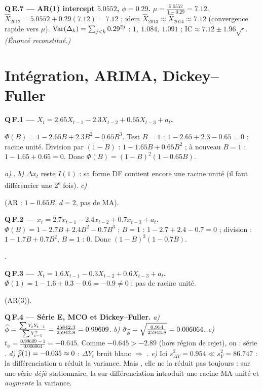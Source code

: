 \documentclass[11pt]{article}
\begin{document}
\textbf{Q\,E.7 --- AR(1) intercept $5.0552$, $\phi=0.29$.}
$\mu=\frac{5.0552}{1-0.29}=7.12$. $\widehat X_{2012}=5.0552+0.29(7.12)=7.12$ ; idem
$\widehat X_{2013}\approx\widehat X_{2014}\approx7.12$ (convergence rapide vers $\mu$).
$\operatorname{Var}(\Delta_k)=\sum_{j<k}0.29^{2j}$ : $1,\ 1.084,\ 1.091$ ; IC$\approx7.12\pm1.96\sqrt{\cdot}$.
\emph{(Énoncé reconstitué.)}

\section{Intégration, ARIMA, Dickey--Fuller}

\textbf{Q\,F.1 --- $X_t=2.65X_{t-1}-2.3X_{t-2}+0.65X_{t-3}+a_t$.}
\begin{etapes}
$\Phi(B)=1-2.65B+2.3B^2-0.65B^3$. Test $B=1$ : $1-2.65+2.3-0.65=0$ : racine unité.
Division par $(1-B)$ : $1-1.65B+0.65B^2$ ; à nouveau $B=1$ : $1-1.65+0.65=0$. Donc
$\Phi(B)=(1-B)^2(1-0.65B)$.
\end{etapes}
\emph{a)} . \emph{b)} $\Delta x_t$ reste $I(1)$ : sa forme DF
contient encore une racine unité (il faut différencier une 2\textsuperscript{e} fois).
\emph{c)} \begin{reponse} (AR : $1-0.65B$, $d=2$, pas de MA).\end{reponse}

\textbf{Q\,F.2 --- $x_t=2.7x_{t-1}-2.4x_{t-2}+0.7x_{t-3}+a_t$.}
$\Phi(B)=1-2.7B+2.4B^2-0.7B^3$ ; $B=1$ : $1-2.7+2.4-0.7=0$ ; division :
$1-1.7B+0.7B^2$, $B=1$ : $0$. Donc $(1-B)^2(1-0.7B)$.
\begin{reponse}.\end{reponse}

\textbf{Q\,F.3 --- $X_t=1.6X_{t-1}-0.3X_{t-2}+0.6X_{t-3}+a_t$.}
$\Phi(1)=1-1.6+0.3-0.6=-0.9\ne0$ : pas de racine unité.
\begin{reponse} (AR(3)).\end{reponse}

\textbf{Q\,F.4 --- Série E, MCO et Dickey--Fuller.}
\emph{a)} $\widehat{\phi}=\frac{\sum Y_tY_{t-1}}{\sum Y_{t-1}^2}=\frac{25842.3}{25943.8}=0.99609$.
\emph{b)} $\hat\sigma_{\widehat{\phi}}=\sqrt{\frac{0.954}{25943.8}}=0.006064$.
\emph{c)} $t_\phi=\frac{0.99609-1}{0.006064}=-0.645$. Comme $-0.645>-2.89$ (hors région de
rejet), on  : série .
\emph{d)} $\widehat{\rho}(1)=-0.035\approx0$ : $\Delta Y_t$ bruit blanc $\Rightarrow$ .
\emph{e)} Ici $s^2_{\Delta Y}=0.954\ll s_Y^2=86.747$ : la différenciation a réduit la variance.
Mais , elle ne la réduit pas toujours : sur une série \emph{déjà} stationnaire, la
sur-différenciation introduit une racine MA unité et \emph{augmente} la variance.
\end{document}
